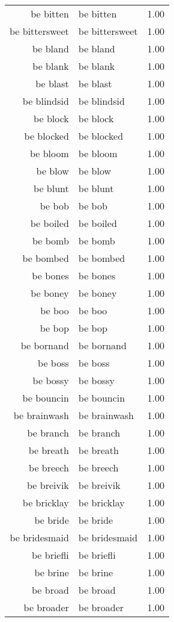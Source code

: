 \begin{table}[ht]
\begin{tabular}{rlr}
  be bitten & be bitten & 1.00 \\ 
  be bittersweet & be bittersweet & 1.00 \\ 
  be bland & be bland & 1.00 \\ 
  be blank & be blank & 1.00 \\ 
  be blast & be blast & 1.00 \\ 
  be blindsid & be blindsid & 1.00 \\ 
  be block & be block & 1.00 \\ 
  be blocked & be blocked & 1.00 \\ 
  be bloom & be bloom & 1.00 \\ 
  be blow & be blow & 1.00 \\ 
  be blunt & be blunt & 1.00 \\ 
  be bob & be bob & 1.00 \\ 
  be boiled & be boiled & 1.00 \\ 
  be bomb & be bomb & 1.00 \\ 
  be bombed & be bombed & 1.00 \\ 
  be bones & be bones & 1.00 \\ 
  be boney & be boney & 1.00 \\ 
  be boo & be boo & 1.00 \\ 
  be bop & be bop & 1.00 \\ 
  be bornand & be bornand & 1.00 \\ 
  be boss & be boss & 1.00 \\ 
  be bossy & be bossy & 1.00 \\ 
  be bouncin & be bouncin & 1.00 \\ 
  be brainwash & be brainwash & 1.00 \\ 
  be branch & be branch & 1.00 \\ 
  be breath & be breath & 1.00 \\ 
  be breech & be breech & 1.00 \\ 
  be breivik & be breivik & 1.00 \\ 
  be bricklay & be bricklay & 1.00 \\ 
  be bride & be bride & 1.00 \\ 
  be bridesmaid & be bridesmaid & 1.00 \\ 
  be briefli & be briefli & 1.00 \\ 
  be brine & be brine & 1.00 \\ 
  be broad & be broad & 1.00 \\ 
  be broader & be broader & 1.00 \\ 

\end{tabular}
\end{table}
